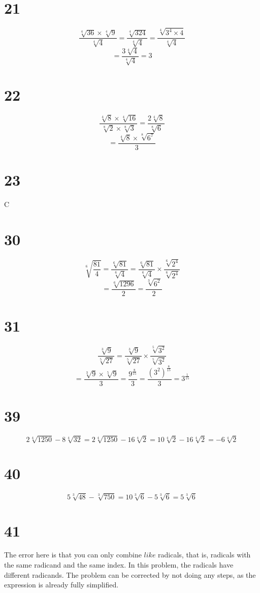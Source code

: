 \documentclass{article}
\theoremstyle{definition}
\begin{document}
\section*{21}
\[ \frac{\sqrt[4]{36}\times \sqrt[4]{9}}{\sqrt[4]{4}}=\frac{\sqrt[4]{324}}{\sqrt[4]{4}}=\frac{\sqrt[4]{3^4\times 4}}{\sqrt[4]{4}} \]
\[ =\frac{3\sqrt[4]{4}}{\sqrt[4]{4}}=3 \]

\section*{22}
\[ \frac{\sqrt[4]{8}\times\sqrt[4]{16}}{\sqrt[8]{2}\times\sqrt[8]{3}}=\frac{2\sqrt[4]{8}}{\sqrt[8]{6}} \]
\[ =\frac{\sqrt[4]{8}\times\sqrt[8]{6^7}}{3} \]

\section*{23}
C

\section*{30}
\[ \sqrt[6]{\frac{81}{4}}=\frac{\sqrt[6]{81}}{\sqrt[6]{4}}=\frac{\sqrt[6]{81}}{\sqrt[6]{4}}\times\frac{\sqrt[6]{2^4}}{\sqrt[6]{2^4}} \]
\[ =\frac{\sqrt[6]{1296}}{2}=\frac{\sqrt[3]{6^2}}{2} \]

\section*{31}
\[ \frac{\sqrt[3]{9}}{\sqrt[5]{27}}=\frac{\sqrt[3]{9}}{\sqrt[5]{27}}\times\frac{\sqrt[5]{3^2}}{\sqrt[5]{3^2}} \]
\[ =\frac{\sqrt[3]{9}\times\sqrt[5]{9}}{3}=\frac{9^\frac{8}{15}}{3}=\frac{(3^2)^\frac{8}{15}}{3}=3^\frac{1}{15} \]

\section*{39}
\[ 2\sqrt[4]{1250}-8\sqrt[4]{32}=2\sqrt[4]{1250}-16\sqrt[4]{2}=10\sqrt[4]{2}-16\sqrt[4]{2}=-6\sqrt[4]{2} \]

\section*{40}
\[ 5\sqrt[3]{48}-\sqrt[3]{750}=10\sqrt[3]{6}-5\sqrt[3]{6}=5\sqrt[3]{6} \]

\section*{41}
The error here is that you can only combine $like$ radicals, that is, radicals with the same radicand and the same index. In this problem, 
the radicals have different radicands. The problem can be corrected by not doing any steps, as the expression is already fully simplified.
\end{document}
